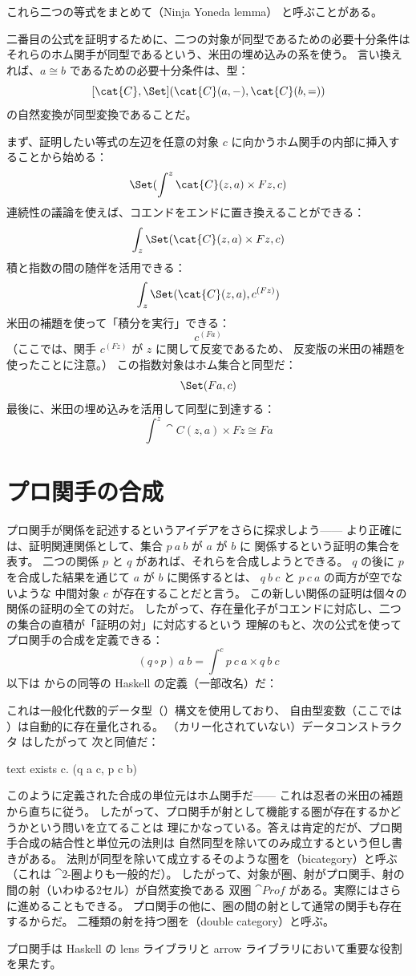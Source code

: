 これら二つの等式をまとめて（Ninja Yoneda lemma）
と呼ぶことがある。

二番目の公式を証明するために、二つの対象が同型であるための必要十分条件は
それらのホム関手が同型であるという、米田の埋め込みの系を使う。
言い換えれば、$a \cong b$ であるための必要十分条件は、型：
\[[\cat{C}, \Set](\cat{C}(a, -), \cat{C}(b, =))\]
の自然変換が同型変換であることだ。

まず、証明したい等式の左辺を任意の対象 $c$ に向かうホム関手の内部に挿入することから始める：
\[\Set(\int^z \cat{C}(z, a)\times{}F z, c)\]
連続性の議論を使えば、コエンドをエンドに置き換えることができる：
\[\int_z \Set(\cat{C}(z, a)\times{}F z, c)\]
積と指数の間の随伴を活用できる：
\[\int_z \Set(\cat{C}(z, a), c^{(F z)})\]
米田の補題を使って「積分を実行」できる：
\[c^{(F a)}\]
（ここでは、関手 $c^{(F z)}$ が $z$ に関して反変であるため、
反変版の米田の補題を使ったことに注意。）
この指数対象はホム集合と同型だ：
\[\Set(F a, c)\]
最後に、米田の埋め込みを活用して同型に到達する：
\[\int^z \cat{C}(z, a)\times{}F z \cong F a\]

\section{プロ関手の合成}

プロ関手が関係を記述するというアイデアをさらに探求しよう——
より正確には、証明関連関係として、集合 $p\ a\ b$ が $a$ が $b$ に
関係するという証明の集合を表す。
二つの関係 $p$ と $q$ があれば、それらを合成しようとできる。
$q$ の後に $p$ を合成した結果を通じて $a$ が $b$ に関係するとは、
$q\ b\ c$ と $p\ c\ a$ の両方が空でないような
中間対象 $c$ が存在することだと言う。
この新しい関係の証明は個々の関係の証明の全ての対だ。
したがって、存在量化子がコエンドに対応し、二つの集合の直積が「証明の対」に対応するという
理解のもと、次の公式を使ってプロ関手の合成を定義できる：
\[(q \circ p)\ a\ b = \int^c p\ c\ a\times{}q\ b\ c\]
以下は  からの同等の Haskell の定義（一部改名）だ：

これは一般化代数的データ型（）構文を使用しており、
自由型変数（ここでは ）は自動的に存在量化される。
（カリー化されていない）データコンストラクタ  はしたがって
次と同値だ：

\begin{snip}{text}
exists c. (q a c, p c b)
\end{snip}
このように定義された合成の単位元はホム関手だ——
これは忍者の米田の補題から直ちに従う。
したがって、プロ関手が射として機能する圏が存在するかどうかという問いを立てることは
理にかなっている。答えは肯定的だが、プロ関手合成の結合性と単位元の法則は
自然同型を除いてのみ成立するという但し書きがある。
法則が同型を除いて成立するそのような圏を（bicategory）と呼ぶ
（これは $\cat{2}$-圏よりも一般的だ）。
したがって、対象が圏、射がプロ関手、射の間の射（いわゆる2セル）が自然変換である
双圏 $\cat{Prof}$ がある。実際にはさらに進めることもできる。
プロ関手の他に、圏の間の射として通常の関手も存在するからだ。
二種類の射を持つ圏を（double category）と呼ぶ。

プロ関手は Haskell の lens ライブラリと arrow ライブラリにおいて重要な役割を果たす。

